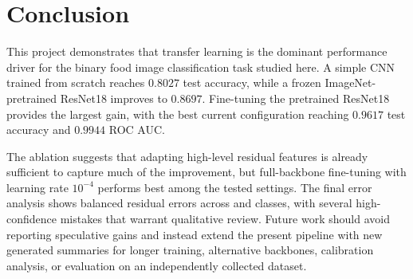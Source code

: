 \section{Conclusion}

This project demonstrates that transfer learning is the dominant performance driver for the binary food image classification task studied here. A simple CNN trained from scratch reaches \(0.8027\) test accuracy, while a frozen ImageNet-pretrained ResNet18 improves to \(0.8697\). Fine-tuning the pretrained ResNet18 provides the largest gain, with the best current configuration reaching \(0.9617\) test accuracy and \(0.9944\) ROC AUC.

The ablation suggests that adapting high-level residual features is already sufficient to capture much of the improvement, but full-backbone fine-tuning with learning rate \(10^{-4}\) performs best among the tested settings. The final error analysis shows balanced residual errors across \Healthy{} and \Unhealthy{} classes, with several high-confidence mistakes that warrant qualitative review. Future work should avoid reporting speculative gains and instead extend the present pipeline with new generated summaries for longer training, alternative backbones, calibration analysis, or evaluation on an independently collected dataset.
